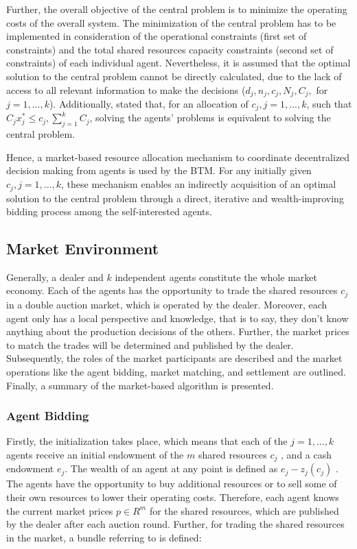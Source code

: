 Further, the overall objective of the central problem is to minimize the operating costs of the overall system. The minimization of the central problem
has to be implemented in consideration of the operational constraints 
(first set of constraints) and the total shared resources capacity constraints (second set of constraints) of each individual agent. 
Nevertheless, it is assumed that the optimal solution to the central problem cannot be directly calculated, due to the lack of access to all relevant
information to make the decisions ($d_{j}, n_{j}, c_{j}, N_{j}, C_{j},$ for $j=1, ..., k$). 
Additionally,  stated that, for an allocation of 
$c_{j}, j=1, ..., k$, such that $C_{j}x_{j}^{*} \leq c_{j}, \sum\limits_{j=1}^{k} C_{j}$, 
solving the agents’ problems is equivalent to solving the central problem.

Hence, a market-based resource allocation mechanism to coordinate decentralized
decision making from agents is used by the BTM. 
For any initially given $c_{j}, j=1, ..., k$, these mechanism enables an indirectly
acquisition of an optimal solution to the central problem through a direct, iterative and
wealth-improving bidding process among the self-interested agents. 


\subsection{Market Environment}
Generally, a dealer and $k$ independent agents constitute the whole market economy. 
Each of the agents has the opportunity to trade the shared resources $c_{j}$ 
in a double auction market, which is operated by the dealer. Moreover, each agent only has a local perspective 
and knowledge, that is to say, they don't know anything about the production decisions of the others. 
Further, the market prices to match the trades will be determined and published by the dealer.
Subsequently, the roles of the market participants are described
and the market operations like the agent bidding, market matching, 
and settlement are outlined. Finally, a summary of the market-based algorithm is presented. 

\subsubsection{Agent Bidding}
\label{sec:agent_bidding}
Firstly, the initialization takes place, which means that each of the $j=1, ..., k$ agents receive an initial
endowment of the $m$ shared resources $c_{j}$ , and a cash endowment $e_{j}$.
The wealth of an agent at any point is defined as $e_{j} - z_{j}(c_{j})$ .
The agents have the opportunity to buy additional resources or to sell some of their own resources to lower their operating costs. 
Therefore, each agent knows the current market prices $p \in R^{m}$ for the shared resources, 
which are published by the dealer after each auction round. Further, for trading the shared resources in the market, 
a bundle referring to  is defined:

